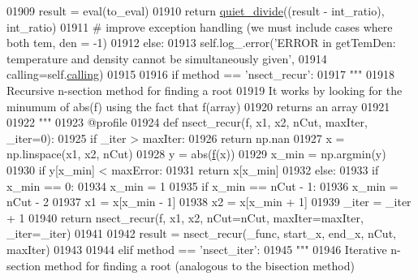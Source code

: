 \begin{DoxyCode}
{{01909                 result = eval(to\_eval)
01910                 \textcolor{keywordflow}{return} \hyperlink{namespacepyneb_1_1utils_1_1misc_afa4163f24be7b1472200c24824c72ae1}{quiet\_divide}((result - int\_ratio), int\_ratio)
01911         \textcolor{comment}{# improve exception handling (we must include cases where both tem, den = -1) }
01912         \textcolor{keywordflow}{else}:
01913             self.log\_.error(\textcolor{stringliteral}{'ERROR in getTemDen: temperature and density cannot be simultaneously given'},
01914                             calling=self.\hyperlink{classpyneb_1_1core_1_1pynebcore_1_1_atom_a373b7735acf4f528b54bddf373ad67a1}{calling})
01915 
01916         \textcolor{keywordflow}{if} method == \textcolor{stringliteral}{'nsect\_recur'}:
01917             \textcolor{stringliteral}{"""}
01918 \textcolor{stringliteral}{            Recursive n-section method for finding a root}
01919 \textcolor{stringliteral}{            It works by looking for the minumum of abs(f) using the fact that f(array) }
01920 \textcolor{stringliteral}{                returns an array}
01921 \textcolor{stringliteral}{}
01922 \textcolor{stringliteral}{            """}
01923             @profile
01924             \textcolor{keyword}{def }nsect\_recur(f, x1, x2, nCut, maxIter, \_iter=0):
01925                 \textcolor{keywordflow}{if} \_iter > maxIter:
01926                     \textcolor{keywordflow}{return} np.nan
01927                 x = np.linspace(x1, x2, nCut)
01928                 y = abs(\hyperlink{namespacepyneb_1_1utils_1_1_fortran_format_af94352584eced016c14d524330879115}{f}(x))
01929                 x\_min = np.argmin(y)
01930                 \textcolor{keywordflow}{if} y[x\_min] < maxError:
01931                     \textcolor{keywordflow}{return} x[x\_min]
01932                 \textcolor{keywordflow}{else}:
01933                     \textcolor{keywordflow}{if} x\_min == 0:
01934                         x\_min = 1
01935                     \textcolor{keywordflow}{if} x\_min == nCut - 1:
01936                         x\_min = nCut - 2
01937                     x1 = x[x\_min - 1]
01938                     x2 = x[x\_min + 1]
01939                     \_iter = \_iter + 1
01940                     \textcolor{keywordflow}{return} nsect\_recur(f, x1, x2, nCut=nCut, maxIter=maxIter, \_iter=\_iter)
01941 
01942             result = nsect\_recur(\_func, start\_x, end\_x, nCut, maxIter)
01943 
01944         \textcolor{keywordflow}{elif} method == \textcolor{stringliteral}{'nsect\_iter'}:
01945             \textcolor{stringliteral}{"""}
01946 \textcolor{stringliteral}{            Iterative n-section method for finding a root (analogous to the bisection method)}
}}
\end{DoxyCode}

